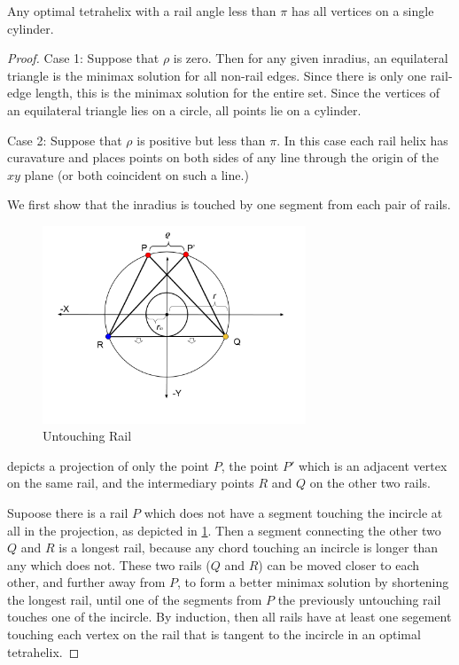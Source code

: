 \documentclass[review]{siamonline1116}
\begin{document}
\begin{theorem}
  \label{thm:cylinder}
  Any optimal tetrahelix with a rail angle less than $\pi$ has all vertices on a single cylinder.
\end{theorem}

\begin{proof}

Case 1: Suppose that $\rho$ is zero. Then for any given inradius, an equilateral
triangle is the minimax solution for all non-rail edges. Since there is only
one rail-edge length, this is the minimax solution for the entire set. Since
the vertices of an equilateral triangle lies on a circle, all points lie on
a cylinder.

Case 2: Suppose that $\rho$ is positive but less than $\pi$.
In this case each rail helix has
curavature and places points on both sides of any line through the origin
of the $xy$ plane (or both coincident on such a line.)

We first show that the inradius is touched by one segment from each pair
of rails.

\begin{figure}[H]
     \centering
     \includegraphics[width=0.7\textwidth]{figures/UntouchingRail.png}
     \caption{Untouching Rail}
  \label{untouchingrailfig}
\end{figure}

 depicts a projection of
only the point $P$, the point $P'$ which is an adjacent vertex on the same rail,
and the intermediary points $R$ and $Q$ on the other two rails.

Supoose there is a rail $P$ which does not have a segment touching the incircle
at all in the projection, as depicted in \cref{untouchingrailfig}.
Then a segment connecting the other two $Q$ and $R$ is a longest
rail, because any chord touching an incircle is longer than any which does not.
These two rails ($Q$ and $R$) can be moved closer to each other, and further away from $P$, to form a better minimax solution
by shortening the longest rail, until one of the segments from $P$ the previously
untouching rail touches one of the incircle. By induction, then all rails have
at least one segement touching each vertex on the rail that is tangent to the
incircle in an optimal tetrahelix.


\end{proof}
\end{document}

